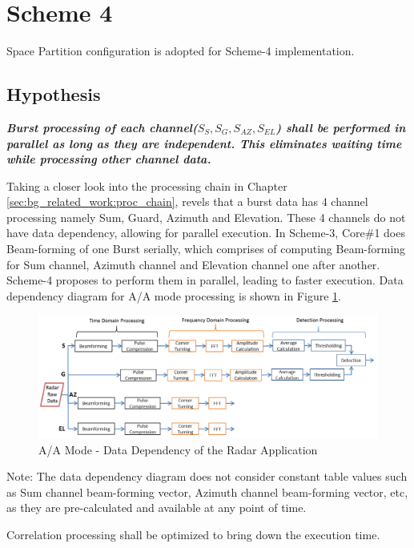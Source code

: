 \section{Scheme 4}
\label{sec:mm:scheme5}
Space Partition configuration is adopted for Scheme-4 implementation.
\subsection{Hypothesis}
\textsl{\textbf{Burst processing of each channel($S_{S},S_{G},S_{AZ},S_{EL}$) shall be performed in parallel as long as they are independent. This eliminates waiting time while processing other channel data. }}
\begin{compactitem}
\item Taking a closer look into the processing chain in Chapter \ref{sec:bg_related_work:proc_chain}, revels that a burst data has 4 channel processing namely Sum, Guard, Azimuth and Elevation.  These 4 channels do not have data dependency, allowing for parallel execution. In Scheme-3, Core\#1 does Beam-forming of one Burst serially, which comprises of computing Beam-forming for Sum channel, Azimuth channel and Elevation channel one after another. Scheme-4 proposes to perform them in parallel, leading to faster execution.
Data dependency diagram for A/A mode processing is shown in Figure \ref{fig:mm:scheme5_data_path}.

\begin{figure}[h!]
	\centering
	\includegraphics[width=160mm]{figures/scheme5_data_path}
	\caption{A/A Mode - Data Dependency of the Radar Application}
	\label{fig:mm:scheme5_data_path}
\end{figure}
Note: The data dependency diagram does not consider constant table values such as Sum channel beam-forming vector, Azimuth channel beam-forming vector, etc, as they are pre-calculated and available at any point of time.

\item Correlation processing shall be optimized to bring down the execution time.
\end{compactitem}

